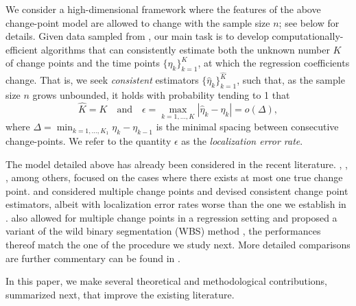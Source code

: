 \documentclass[twoside]{article}
\begin{document}
We consider a high-dimensional framework where the features of the above change-point model  are allowed to change with the sample size $n$; see  below for details. Given data sampled from , our main task is to develop computationally-efficient algorithms that can consistently estimate both the unknown number $K$ of change points and the time points $\{\eta_k\}_{k = 1}^K$, at which the regression coefficients change.  That is, we seek \emph{consistent} estimators $\{\hat{\eta}_k\}_{k = 1}^{\widehat{K}}$, such that, as the sample size $n$ grows unbounded, it holds with probability tending to 1 that 
	\[
		\widehat{K} = K \quad \mbox{and} \quad \epsilon = \max_{k = 1, \ldots, K} |\widehat \eta_k -\eta_k|  = o(\Delta),
	\]
	where $\Delta = \min_{k=1,\ldots,K_1} \eta_k - \eta_{k-1}$ is the minimal spacing between consecutive change-points.
	We refer to the quantity $\epsilon$ as the {\it localization error rate}. 


The model detailed above has already been considered in the recent literature.  \cite{lee2016lasso}, \cite{kaul2018parameter}, \cite{lee2018oracle}, among others, focused on the cases where there exists at most one true change point.  \cite{leonardi2016computationally} and \cite{zhang2015change} considered multiple change points and devised consistent change point estimators, albeit with localization error rates worse than the one we establish in .  \cite{wang2019statistically} also allowed for multiple change points in a regression setting and proposed a variant of the wild binary segmentation  (WBS) method \citep{fryzlewicz2014wild}, the performances thereof match the one of the procedure we study next.   More detailed comparisons are further commentary can be found in .


In this paper, we make several theoretical and methodological contributions, summarized next, that improve the existing literature. 	
\end{document}
